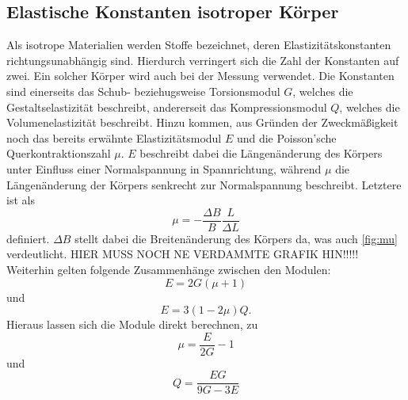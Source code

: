     \subsection{Elastische Konstanten isotroper Körper}
    \label{sec:konstanten}
    Als isotrope Materialien werden Stoffe bezeichnet, deren Elastizitätskonstanten richtungsunabhängig sind. Hierdurch verringert
    sich die Zahl der Konstanten auf zwei. Ein solcher Körper wird auch bei der Messung verwendet.
    Die Konstanten sind einerseits das Schub- beziehugsweise Torsionsmodul $G$, welches die Gestaltselastizität beschreibt, 
    andererseit das Kompressionsmodul $Q$, welches die Volumenelastizität beschreibt. Hinzu kommen, aus Gründen der Zweckmäßigkeit
    noch das bereits erwähnte Elastizitätsmodul $E$ und die Poisson'sche Querkontraktionszahl $\mu$.
    $E$ beschreibt dabei die Längenänderung des Körpers unter Einfluss einer Normalspannung in Spannrichtung, während $\mu$ 
    die Längenänderung der Körpers senkrecht zur Normalspannung beschreibt. Letztere ist als 
    \begin{equation}
    \label{eqn:mu}
    \mu = - \frac{\Delta B}{B} \frac {L}{\Delta L}
    \end{equation}
    definiert. $\Delta B$ stellt dabei die Breitenänderung des Körpers da, was auch \autoref{fig:mu} verdeutlicht.
    HIER MUSS NOCH NE VERDAMMTE GRAFIK HIN!!!!!
    Weiterhin gelten folgende Zusammenhänge zwischen den Modulen:
    \begin{equation}
    \label{eqn:Zusammenhang1}
    E = 2 G (\mu + 1)
    \end{equation}
    und
    \begin{equation}
    \label{eqn:Zusammenhang2}
    E = 3 (1- 2 \mu) Q.
    \end{equation}
    Hieraus lassen sich die Module direkt berechnen, zu
    \begin{equation}
    \label{eqn:mubestimmen}
    \mu = \frac{E}{2G} -1
    \end{equation}
    und 
    \begin{equation}
    \label{eqn:Qbestimmen}
    Q = \frac{EG}{9G - 3E}
    \end{equation}
    
